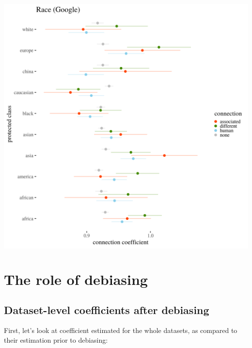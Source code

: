 \documentclass[
  12pt,
]{book}
\begin{document}
\includegraphics[width=14cm]{../images/visRaceGoogle.png}

\hypertarget{the-role-of-debiasing}{%
\chapter{The role of debiasing}\label{the-role-of-debiasing}}


\hypertarget{dataset-level-coefficients-after-debiasing}{%
\section{Dataset-level coefficients after debiasing}\label{dataset-level-coefficients-after-debiasing}}

First, let's look at coefficient estimated for the whole datasets, as compared to their estimation prior to debiasing:
\end{document}
